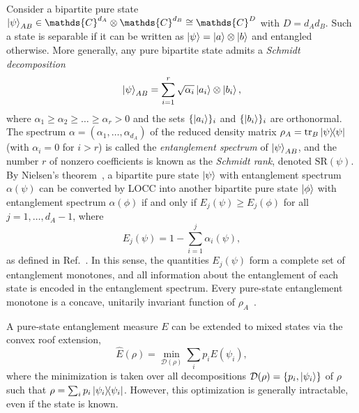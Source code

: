 \documentclass[aps,pra,twocolumn,showpacs,superscriptaddress,groupedaddress]{revtex4-2}
\renewcommand{\a}{\alpha}
\newcommand{\C}{\mathds{C}}
\begin{document}
Consider a bipartite pure state $\ket{\psi}_{AB} \in \C^{d_A} \otimes \C^{d_B} \cong \C^D$ with $D = d_Ad_B$. Such a state is separable if it can be written as $\ket{\psi}=\ket{a}\otimes\ket{b}$ and entangled otherwise. More generally, any pure bipartite state admits a \emph{Schmidt decomposition}
\begin{equation}\label{eq:SchmidtDec}
    \ket{\psi}_{AB} = \sum_{i=1}^r \sqrt{\a_i}\ket{a_i}\otimes\ket{b_i},
\end{equation}
where $\a_1\geq\a_2\geq\dots\geq\a_r>0$ and the sets $\{\ket{a_i}\}_i$ and $\{\ket{b_i}\}_i$ are orthonormal. The spectrum $\a=(\a_1,\dots,\a_{d_A})$ of the reduced density matrix $\rho_A=\tr_B\dyad{\psi}$ (with $\a_i=0$ for $i>r$) is called the {\em entanglement spectrum} of $\ket{\psi}_{AB}$, and the number $r$ of nonzero coefficients is known as the {\em Schmidt rank}, denoted $\mathrm{SR}(\psi)$.
By Nielsen's theorem~\cite{Nielsen1999MajLOCC}, a bipartite pure state $\ket{\psi}$ with entanglement spectrum $\a(\psi)$ can be converted by LOCC into another bipartite pure state $\ket{\phi}$ with entanglement spectrum $\a(\phi)$ if and only if $E_j(\psi)\geq E_j(\phi)$ for all $j=1,\dots,d_A-1$, where
\begin{equation}\label{eq:Vidal}
    E_j(\psi)=1-\sum_{i=1}^{j} \a_i(\psi),
\end{equation}
as defined in Ref.~\cite{Vidal_1999}. In this sense, the quantities $E_j(\psi)$ form a complete set of entanglement monotones, and all information about the entanglement of each state is encoded in the entanglement spectrum. Every pure-state entanglement monotone is a concave, unitarily invariant function of $\rho_A$~\cite{Vidal_2000}.

A pure-state entanglement measure $E$ can be extended to mixed states via the convex roof extension,
\begin{equation}\label{eq:CRoof}
    \widehat{E}(\rho) = \min_{\mathcal{D}(\rho)} \sum_i p_i E(\psi_i),
\end{equation}
where the minimization is taken over all decompositions
$\mathcal{D}(\rho)=\{p_i,\ket{\psi_i}\}$ of $\rho$ such that $\rho = \sum_i p_i \dyad{\psi_i}$. However, this optimization is generally intractable, even if the state is known.

\end{document}
